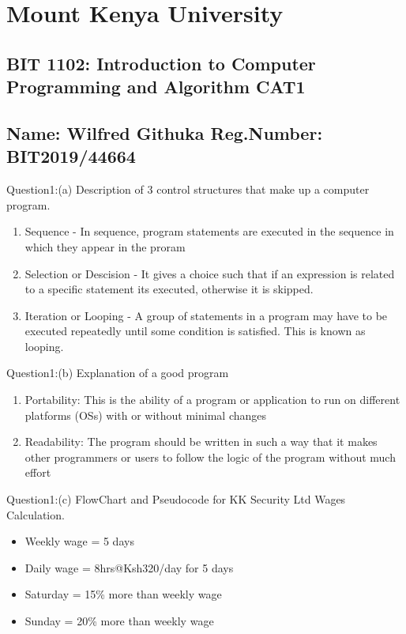 \documentclass[12pt,legal]{article}
\begin{document}
\section{Mount Kenya University}
\subsection{BIT 1102: Introduction to Computer Programming and Algorithm CAT1}
\subsection{Name: Wilfred Githuka Reg.Number: BIT2019/44664}

Question1:(a) Description of 3 control structures that make up a computer program.
\begin{enumerate}
  \item{Sequence - In sequence, program statements are executed in the sequence
      in which they appear in the proram}
  \item{Selection or Descision - It gives a choice such that if an expression
      is related to a specific statement its executed, otherwise it is skipped.}
  \item{Iteration or Looping - A group of statements in a program may have to
        be executed repeatedly until some condition is satisfied. This is known
        as looping.}
  \end{enumerate}
Question1:(b) Explanation of a good program
    \begin{enumerate}
    \item{Portability: This is the ability of a program or application to run on
        different platforms (OSs) with or without minimal changes}
      \item{Readability: The program should be written in such a way that it
          makes other programmers or users to follow the logic of the program
          without much effort}
      \end{enumerate}
Question1:(c) FlowChart and Pseudocode for KK Security Ltd Wages
Calculation.
\begin{itemize}
\item{Weekly wage = 5 days}
\item{Daily wage = 8hrs@Ksh320/day for 5 days}
\item{Saturday = 15\% more than weekly wage}
\item{Sunday = 20\% more than weekly wage}
\end{itemize}
\end{document}
